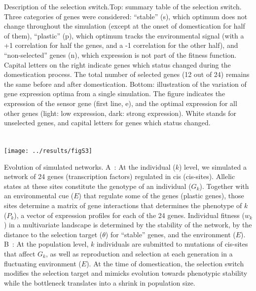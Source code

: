 \documentclass[10pt,a4paper]{article}
\begin{document}
\vspace{2cm}

Description of the selection switch.Top: summary table of the selection switch. Three categories of genes were considered: “stable” (s), which optimum does not change throughout the simulation (except at the onset of domestication for half of them), “plastic” (p), which optimum tracks the environmental signal (with a +1 correlation for half the genes, and a -1 correlation for the other half), and “non-selected” genes (n), which expression is not part of the fitness function. Capital letters on the right indicate genes which status changed during the domestication process. The total number of selected genes (12 out of 24) remains the same before and after domestication. Bottom: illustration of the variation of gene expression optima from a single simulation. The figure indicates the expression of the sensor gene (first line, e), and the optimal expression for all other genes (light: low expression, dark: strong expression). White stands for unselected genes, and capital letters for genes which status changed. 

\clearpage

\section{}

\begin{center}
\texttt{[image: ../results/figS3]}
\end{center}

Evolution of simulated networks. 
A : At the individual ($k$) level, we simulated a network of 24 genes (transcription factors) regulated in cis (cis-sites). 
Allelic states at these  sites constitute the genotype of an individual ($G_k$). Together with an environmental cue ($E$) that regulate some of the genes (plastic genes), those sites determine a matrix of gene interactions that determines the phenotype of $k$ ($P_k$), a vector of expression profiles for each of the 24 genes. 
Individual fitness ($w_k$) in a multivariate landscape is determined by the stability of the network, by the distance to the selection target ($\theta$) for “stable” genes, and the environment ($E$). 
B : At the population level, $k$ individuals are submitted to mutations of cis-sites that affect $G_k$, as well as reproduction and selection at each generation in a fluctuating environment ($E$). At the time of domestication, the selection switch modifies the selection target and mimicks evolution towards phenotypic stability while the bottleneck translates into a shrink in population size.
\end{document}
